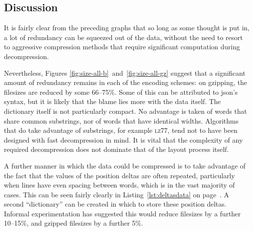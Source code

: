 

\clearpage


\subsection{Discussion}

It is fairly clear from the preceding graphs that so long as some thought is put in, a lot of redundancy can be squeezed out of the data, without the need to resort to aggressive compression methods that require significant computation during decompression.

Nevertheless, Figures \ref{fig:size-all-b}~and~\ref{fig:size-all-gz} suggest that a significant amount of redundancy remains in each of the encoding schemes: on gzipping, the filesizes are reduced by some 66--75\%. Some of this can be attributed to \gls{json}'s syntax, but it is likely that the blame lies more with the data itself. The dictionary itself is not particularly compact. No advantage is taken of words that share common substrings, nor of words that have identical widths.
Algorithms that do take advantage of substrings, for example \textsc{lz77},\hspace{0pt}\cite{Ziv1977} tend not to have been designed with fast decompression in mind. It is vital that the complexity of any required decompression does not dominate that of the layout process itself.

A further manner in which the data could be compressed is to take advantage of the fact that the values of the position deltas are often repeated, particularly when lines have even spacing between words, which is in the vast majority of cases. This can be seen fairly clearly in Listing~\ref{lst:deltasdata} on page~\pageref{lst:deltasdata}. A second ``dictionary'' can be created in which to store these position deltas. Informal experimentation has suggested this would reduce filesizes by a further 10--15\%, and gzipped filesizes by a further 5\%.

